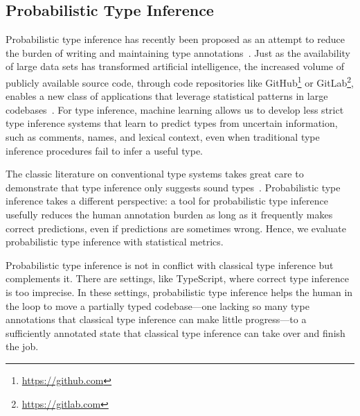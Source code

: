 \documentclass[acmsmall, review, anonymous]{acmart}\settopmatter{printfolios=true,printccs=false,printacmref=false}
\begin{document}
\subsection{Probabilistic Type Inference}
Probabilistic type inference
has recently been proposed as an attempt to reduce the burden
of writing and maintaining type
annotations~\cite{raychev15,hellendoorn18,wei20}.
Just as the availability of large data sets has transformed artificial intelligence,
the increased volume of publicly available source code, through
code repositories like GitHub\footnote{\href{https://github.com}{https://github.com}}
or GitLab\footnote{\href{https://gitlab.com}{https://gitlab.com}},
enables a new class of applications that leverage statistical
patterns in large codebases~\cite{allamanis17}.
For type inference, machine learning
allows us to develop less strict type inference systems
that learn to predict types from uncertain information,
such as comments, names, and lexical context,
even when traditional type inference procedures
fail to infer a useful type.

The classic literature on conventional type systems takes great care to demonstrate
that type inference only suggests sound types~\cite{DBLP:journals/jcss/Milner78,Pierce2002}.
Probabilistic type inference takes a different perspective:
a tool for probabilistic type inference usefully reduces the human annotation burden
as long as it frequently makes correct predictions, even if predictions are sometimes wrong.
Hence, we evaluate probabilistic type inference with statistical metrics.

Probabilistic type inference is not in conflict with classical type inference but complements it.
There are settings, like TypeScript, where correct type inference is too imprecise.
In these settings, probabilistic type inference helps the human in the loop to move a
partially typed codebase---one lacking so many type annotations that classical type inference
can make little progress---to a sufficiently annotated state that classical type inference can take over and finish the job.
\end{document}
